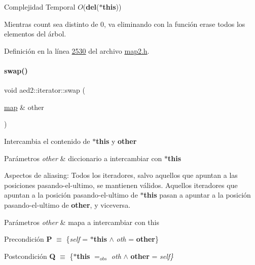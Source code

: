 \begin{DoxyDescription}
\item[Complejidad Temporal]$O$({\bfseries del}({\bfseries $\ast$this}))
\end{DoxyDescription}Mientras count sea distinto de 0, va eliminando con la función erase todos los elementos del árbol. 

Definición en la línea \hyperlink{map2_8h_source_l02530}{2530} del archivo \hyperlink{map2_8h_source}{map2.\+h}.

\mbox{\label{classaed2_1_1iterator_a8ec2215b2dfaf6ddd57b1e0b00d8d3d2_a8ec2215b2dfaf6ddd57b1e0b00d8d3d2}} 
\paragraph{\texorpdfstring{swap()}{swap()}}
{\footnotesize\ttfamily void aed2\+::iterator\+::swap (\begin{DoxyParamCaption}\item[{\hyperlink{classaed2_1_1map}{map} \&}]{other }\end{DoxyParamCaption})\hspace{0.3cm}{\ttfamily [inline]}}



Intercambia el contenido de {\bfseries $\ast$this} y {\bfseries other} 


\begin{DoxyParams}{Parámetros}
{\em other} & diccionario a intercambiar con {\bfseries $\ast$this}\\
\hline
\end{DoxyParams}
\begin{DoxyParagraph}{Aspectos de aliasing\+:}
Todos los iteradores, salvo aquellos que apuntan a las posiciones pasando-\/el-\/ultimo, se mantienen válidos. Aquellos iteradores que apuntan a la posición pasando-\/el-\/ultimo de {\bfseries $\ast$this} pasan a apuntar a la posición pasando-\/el-\/ultimo de {\bfseries other}, y viceversa.
\end{DoxyParagraph}

\begin{DoxyParams}{Parámetros}
{\em other} & mapa a intercambiar con this\\
\hline
\end{DoxyParams}
\begin{DoxyPrecond}{Precondición}
{\bfseries P} $\equiv$ \{{\itshape self} = {\bfseries $\ast$this} $\land$ {\itshape oth} = {\bfseries other}\} 
\end{DoxyPrecond}
\begin{DoxyPostcond}{Postcondición}
{\bfseries Q} $\equiv$ \{{\bfseries $\ast$this} $=_{obs}$ {\itshape oth} $\land$ {\bfseries other} = {\itshape self\}} 
\end{DoxyPostcond}

